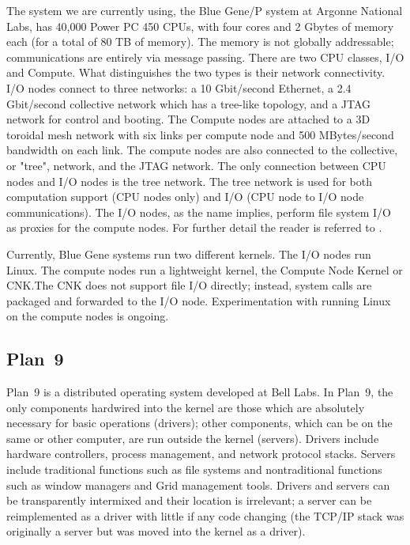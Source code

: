 \documentclass[a4,10pt,preprint]{sigplanconf}
\begin{document}
The system we are currently using, the Blue Gene/P system at Argonne National Labs, has 40,000 Power PC 450 CPUs, 
with four cores and 2 Gbytes of memory each (for a total of 80 TB of memory). The memory is not globally addressable; communications are entirely via message passing. 
There are two CPU classes, I/O and Compute. What distinguishes the two types is their network connectivity. I/O nodes connect
to three networks: a 10 Gbit/second Ethernet, a 2.4 Gbit/second collective network which has a tree-like topology, and
a JTAG network for control and booting. The Compute nodes are attached to a 3D toroidal mesh network with six links per compute node and 500 MBytes/second bandwidth on each link.  The compute nodes are also connected to the collective, or "tree", network, and the JTAG network. The only connection between CPU nodes and I/O nodes is the tree network. The tree network is used for both computation support (CPU nodes only) and I/O (CPU node to I/O node communications). The I/O nodes, as the name implies, perform file system I/O as proxies for the 
compute nodes. For further detail the reader is referred to \cite{plan9bgp}. 

Currently, Blue Gene systems run two different kernels. The I/O nodes run Linux. The compute nodes run a lightweight kernel, the Compute Node Kernel or CNK.The CNK does not support file I/O directly; instead, system calls are packaged and forwarded to the I/O node. Experimentation with running Linux on the compute nodes is ongoing. 

\subsection{Plan~9}
Plan~9\cite{Plan9} is a distributed operating system developed at Bell Labs. In Plan~9, the only components hardwired into the kernel are those which are absolutely necessary for basic operations (drivers); other components, which can be on the same or other computer, are run outside the kernel (servers). Drivers include hardware controllers, process management, and network protocol stacks. Servers include traditional functions such as file systems and nontraditional functions such as window managers and Grid management tools. Drivers and servers can be transparently intermixed and their location is irrelevant; a server can be reimplemented as a driver with little if any code changing (the TCP/IP stack was originally a server but was moved into the kernel as a driver).
\end{document}
